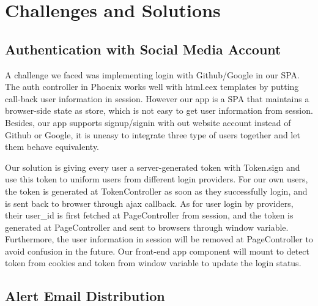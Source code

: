 \section{Challenges and Solutions}
\subsection{Authentication with Social Media Account}
A challenge we faced was implementing login with Github/Google 
in our SPA. The auth controller in Phoenix works well with 
html.eex templates by putting call-back user information in 
session. However our app is a SPA that maintains a browser-side 
state as store, which is not easy to get user information from 
session. Besides, our app supports signup/signin with out website
account instead of Github or Google, it is uneasy to integrate 
three type of users together and let them behave equivalenty.

Our solution is giving every user a server-generated token with 
Token.sign and use this token to uniform users from different 
login providers. For our own users, the token is generated at 
TokenController as soon as they successfully login, and is sent 
back to browser through ajax callback. As for user login by 
providers, their user\_id is first fetched at PageController 
from session, and the token is generated at PageController and 
sent to browsers through window variable. Furthermore, the user 
information in session will be removed at PageController to avoid 
confusion in the future. Our front-end app component will mount 
to detect token from cookies and token from window variable to 
update the login status.

\subsection{Alert Email Distribution}





